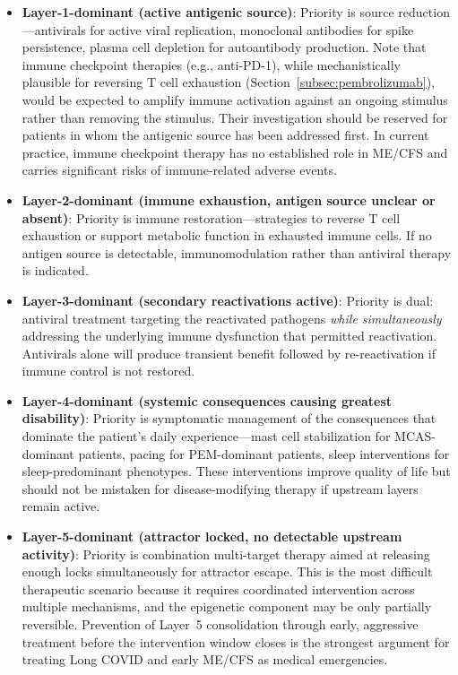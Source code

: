\begin{itemize}
    \item \textbf{Layer-1-dominant (active antigenic source)}: Priority is source reduction---antivirals for active viral replication, monoclonal antibodies for spike persistence, plasma cell depletion for autoantibody production. Note that immune checkpoint therapies (e.g., anti-PD-1), while mechanistically plausible for reversing T cell exhaustion (Section~\ref{subsec:pembrolizumab}), would be expected to amplify immune activation against an ongoing stimulus rather than removing the stimulus. Their investigation should be reserved for patients in whom the antigenic source has been addressed first. In current practice, immune checkpoint therapy has no established role in ME/CFS and carries significant risks of immune-related adverse events.
    \item \textbf{Layer-2-dominant (immune exhaustion, antigen source unclear or absent)}: Priority is immune restoration---strategies to reverse T cell exhaustion or support metabolic function in exhausted immune cells. If no antigen source is detectable, immunomodulation rather than antiviral therapy is indicated.
    \item \textbf{Layer-3-dominant (secondary reactivations active)}: Priority is dual: antiviral treatment targeting the reactivated pathogens \emph{while simultaneously} addressing the underlying immune dysfunction that permitted reactivation. Antivirals alone will produce transient benefit followed by re-reactivation if immune control is not restored.
    \item \textbf{Layer-4-dominant (systemic consequences causing greatest disability)}: Priority is symptomatic management of the consequences that dominate the patient's daily experience---mast cell stabilization for MCAS-dominant patients, pacing for PEM-dominant patients, sleep interventions for sleep-predominant phenotypes. These interventions improve quality of life but should not be mistaken for disease-modifying therapy if upstream layers remain active.
    \item \textbf{Layer-5-dominant (attractor locked, no detectable upstream activity)}: Priority is combination multi-target therapy aimed at releasing enough locks simultaneously for attractor escape. This is the most difficult therapeutic scenario because it requires coordinated intervention across multiple mechanisms, and the epigenetic component may be only partially reversible. Prevention of Layer~5 consolidation through early, aggressive treatment before the intervention window closes is the strongest argument for treating Long COVID and early ME/CFS as medical emergencies.
\end{itemize}

